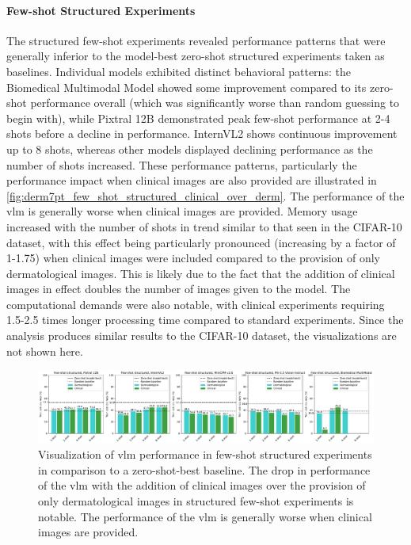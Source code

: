 \documentclass[../ShajiS_RnDReport.tex]{subfiles}
\begin{document}
\paragraph{Few-shot Structured Experiments}
The structured few-shot experiments revealed performance patterns that were generally inferior to the model-best zero-shot structured experiments taken as baselines. Individual models exhibited distinct behavioral patterns: the Biomedical Multimodal Model showed some improvement compared to its zero-shot performance overall (which was significantly worse than random guessing to begin with), while Pixtral 12B demonstrated peak few-shot performance at 2-4 shots before a decline in performance. InternVL2 shows continuous improvement up to 8 shots, whereas other models displayed declining performance as the number of shots increased. These performance patterns, particularly the performance impact when clinical images are also provided are illustrated in \autoref{fig:derm7pt_few_shot_structured_clinical_over_derm}. The performance of the \gls{vlm} is generally worse when clinical images are provided. Memory usage increased with the number of shots in trend similar to that seen in the CIFAR-10 dataset, with this effect being particularly pronounced (increasing by a factor of 1-1.75) when clinical images were included compared to the provision of only dermatological images. This is likely due to the fact that the addition of clinical images in effect doubles the number of images given to the model. The computational demands were also notable, with clinical experiments requiring 1.5-2.5 times longer processing time compared to standard experiments. Since the analysis produces similar results to the CIFAR-10 dataset, the visualizations are not shown here.

\begin{figure}[ht]
    \centering
    \includegraphics[width=\linewidth]{figures/derm7pt_few_shot_structured_clinical_over_derm.pdf}
    \caption{Visualization of \gls{vlm} performance in few-shot structured experiments in comparison to a zero-shot-best baseline. The drop in performance of the \gls{vlm} with the addition of clinical images over the provision of only dermatological images in structured few-shot experiments is notable. The performance of the \gls{vlm} is generally worse when clinical images are provided.}
    \label{fig:derm7pt_few_shot_structured_clinical_over_derm}
\end{figure}
\end{document}
